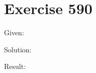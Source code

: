 \documentclass[a4paper, 10pt]{scrartcl}
\begin{document}
\section{Exercise 590}

Given:

Solution:

Result:
\end{document}
